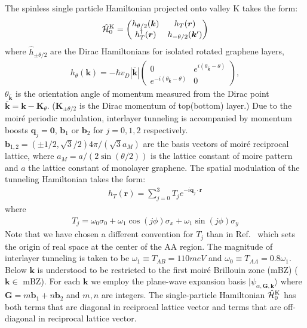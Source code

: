 \documentclass[aps,prl,reprint,amssymb,groupedaddress,twocolumn]{revtex4}
\begin{document}
The spinless single particle Hamiltonian projected onto valley K takes the form:
\begin{align}
\mathcal{\hat{H}}^{\rm{K}}_{0} = 
\begin{pmatrix}
h_{\theta/2}(\bm{k}) & h_{T}(\bm{r})\\
h^\dagger_{T}(\bm{r})  & h_{-\theta/2}(\bm{k}')
\end{pmatrix} \label{ham}
\end{align}
where $\hat{h}_{\pm \theta/2}$ are the Dirac Hamiltonians for isolated rotated graphene layers,
\begin{align}
h_{\theta}(\bm{k}) = -\hbar v_D |\bar{\bm{k}}| 
\begin{pmatrix}
0 & e^{i (\theta_{\bar{\bm{k}}}- \theta)} \\
e^{-i  (\theta_{\bar{\bm{k}}}- \theta)}  & 0
\end{pmatrix},
\end{align}
$\theta_{\bar{\bm{k}}}$ is the orientation angle of momentum measured from the Dirac point 
$\bar{\bm{k}}=\bm{k}-\bm{K}_{\theta}$.  ($\bm{K}_{\pm\theta/2}$ is the Dirac momentum of top(bottom) layer.)
Due to the moir\'{e} periodic modulation, interlayer tunneling is accompanied by momentum boosts 
$\bm{q}_j=\bm{0}$, $\bm{b}_1$ or $\bm{b}_2$ for $j=0, 1, 2$ respectively.
$\bm{b}_{1,2}=(\pm 1/2,\sqrt{3}/2)4\pi/(\sqrt{3}a_M)$
are the basis vectors of moir\'{e} reciprocal lattice, where $a_M=a/(2\sin(\theta/2))$ is the lattice constant of moire pattern 
and $a$ the lattice constant of monolayer graphene.
The spatial modulation of the tunneling Hamiltonian takes the form:
\begin{align}
h_T(\bm{r}) = \sum_{j=0}^3 T_j e^{-i\bm{q}_j\cdot \bm{r}}
\end{align}
where
\begin{align}
T_j = \omega_0\sigma_0 + \omega_1\cos(j\phi)\sigma_x + \omega_1\sin(j\phi)\sigma_y
\end{align}
Note that we have chosen a different convention for $T_j$ than in Ref.~
which sets the origin of real space at the center of the AA region. 
The magnitude of interlayer tunneling is taken to be $\omega_1\equiv T_{AB}=110meV$
and $\omega_0\equiv T_{AA}=0.8\omega_1$.
Below $\bm{k}$ is understood to be restricted
to the first moir\'{e} Brillouin zone (mBZ) ($\bm{k} \in$ mBZ).
For each  $\bm{k}$ we employ the plane-wave expansion basis $|\psi_{\alpha, \bm{G},\bm{k}}\rangle$
where $\bm{G}=m\bm{b}_1+n\bm{b}_2$ and $m,n$ are integers.
The single-particle Hamiltonian $\mathcal{\hat{H}}^{\rm{K}}_{0}$ has both terms
that are diagonal in reciprocal lattice vector and terms that are 
off-diagonal in reciprocal lattice vector.  
\end{document}
